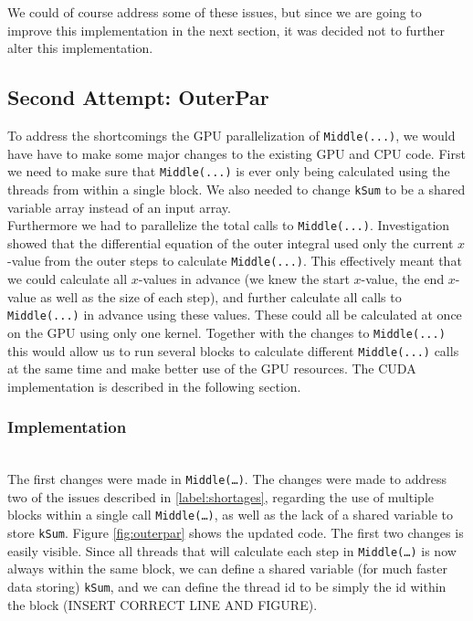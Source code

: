 We could of course address some of these issues, but since we are going to improve this implementation in the next section, it was decided not to further alter this implementation. \\

\subsection{Second Attempt: OuterPar}
To address the shortcomings the GPU parallelization of \texttt{Middle(...)}, we would have have to make some major changes to the existing GPU and CPU code. First we need to make sure that \texttt{Middle(...)} is ever only being calculated using the threads from within a single block. We also needed to change \texttt{kSum} to be a shared variable array instead of an input array. \\

Furthermore we had to parallelize the total calls to \texttt{Middle(...)}. Investigation showed that the differential equation of the outer integral used only the current $x$-value from the outer steps to calculate \texttt{Middle(...)}. This effectively meant that we could calculate all $x$-values in advance (we knew the start $x$-value, the end $x$-value as well as the size of each step), and further calculate all calls to \texttt{Middle(...)} in advance using these values. These could all be calculated at once on the GPU using only one kernel. Together with the changes to \texttt{Middle(...)} this would allow us to run several blocks to calculate different \texttt{Middle(...)} calls at the same time and make better use of the GPU resources. The CUDA implementation is described in the following section.

\subsubsection{Implementation} \hfill \\
The first changes were made in \texttt{Middle(…)}. The changes were made to address two of the issues described in \ref{label:shortages}, regarding the use of multiple blocks within a single call \texttt{Middle(…)}, as well as the lack of a shared variable to store \texttt{kSum}. Figure \ref{fig:outerpar} shows the updated code. The first two changes is easily  visible. Since all threads that will calculate each step in \texttt{Middle(…)} is now always within the same block, we can define a shared variable (for much faster data storing) \texttt{kSum}, and we can define the thread id to be simply the id within the block (INSERT CORRECT LINE AND FIGURE).\\


